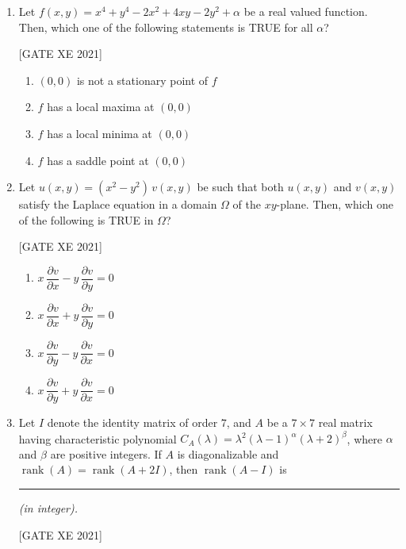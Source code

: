 \documentclass[journal,12pt,onecolumn]{IEEEtran}
\theoremstyle{remark}
\begin{document}
\begin{enumerate}
\hfill[GATE XE 2021]


\item Let \(f(x,y)=x^{4}+y^{4}-2x^{2}+4xy-2y^{2}+\alpha\) be a real valued function. Then, which one of the following statements is TRUE for all \(\alpha\)?

\hfill[GATE XE 2021]

\begin{multicols}{2}
\begin{enumerate}
\item \((0,0)\) is not a stationary point of \(f\)
\item \(f\) has a local maxima at \((0,0)\)
\item \(f\) has a local minima at \((0,0)\)
\item \(f\) has a saddle point at \((0,0)\)
\end{enumerate}
\end{multicols}


\item Let \(u(x,y)=(x^{2}-y^{2})\,v(x,y)\) be such that both \(u(x,y)\) and \(v(x,y)\) satisfy the Laplace equation in a domain \(\Omega\) of the \(xy\)-plane. Then, which one of the following is TRUE in \(\Omega\)?

\hfill[GATE XE 2021]

\begin{multicols}{2}
\begin{enumerate}
\item \(x\,\dfrac{\partial v}{\partial x}-y\,\dfrac{\partial v}{\partial y}=0\)
\item \(x\,\dfrac{\partial v}{\partial x}+y\,\dfrac{\partial v}{\partial y}=0\)
\item \(x\,\dfrac{\partial v}{\partial y}-y\,\dfrac{\partial v}{\partial x}=0\)
\item \(x\,\dfrac{\partial v}{\partial y}+y\,\dfrac{\partial v}{\partial x}=0\)
\end{enumerate}
\end{multicols}

\item
Let $I$ denote the identity matrix of order $7$, and $A$ be a $7\times 7$ real matrix having characteristic polynomial $C_A(\lambda)=\lambda^{2}(\lambda-1)^{\alpha}(\lambda+2)^{\beta}$, where $\alpha$ and $\beta$ are positive integers. If $A$ is diagonalizable and $\operatorname{rank}(A)=\operatorname{rank}(A+2I)$, then $\operatorname{rank}(A-I)$ is \rule{2.5cm}{0.15mm} \textit{(in integer).}

\hfill[GATE XE 2021]



\end{enumerate}
\end{document}
